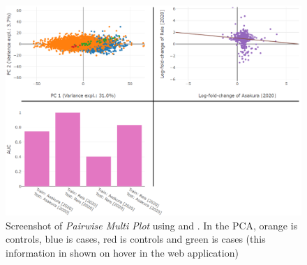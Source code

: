 {{{{{{{{{{{{{{{\begin{figure}
    \centering
    \includegraphics[width=\textwidth]{figs/webapp_screenshots/pairwise_multi_plot_asakura_reis.png}
    \caption{Screenshot of \textit{Pairwise Multi Plot} using \citet{Asakura2020} and \citet{Reis2020}. In the PCA, orange is \citet{Asakura2020} controls, blue is \citet{Asakura2020} cases, red is \citet{Reis2020} controls and green is \citet{Reis2020} cases (this information in shown on hover in the web application)}
    \label{fig:pairwise_multi_plot_asakura_reis}
\end{figure}


}}}}}}}}}}}}}}}
